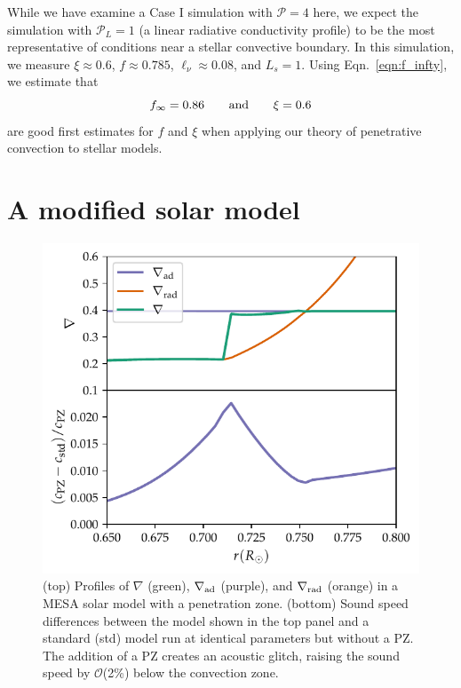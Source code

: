 \documentclass[twocolumn]{aastex631}
\newcommand{\gradrad}{\ensuremath{\nabla_{\rm{rad}}}}
\newcommand{\gradad}{\ensuremath{\nabla_{\rm{ad}}}}
\newcommand{\justgrad}{\ensuremath{\nabla}}
\newcommand{\mP}{\ensuremath{\mathcal{P}}}
\begin{document}
While we have examine a Case I simulation with $\mP = 4$ here, we expect the simulation with $\mP_L = 1$ (a linear radiative conductivity profile) to be the most representative of conditions near a stellar convective boundary.
In this simulation, we measure $\xi \approx 0.6$, $f \approx 0.785$, $\ell_\nu \approx 0.08$, and $L_s = 1$.
Using Eqn.~\ref{eqn:f_infty}, we estimate that
\begin{equation}
f_\infty = 0.86\qquad\rm{and}\qquad
\xi = 0.6
\label{eqn:f_xi_estimates}
\end{equation}
are good first estimates for $f$ and $\xi$ when applying our theory of penetrative convection to stellar models.

\section{A modified solar model}
\label{sec:solar_model}

\begin{figure}[t]
\centering
\includegraphics[width=\columnwidth]{mesa_profiles.pdf}
\caption{
(top) Profiles of $\justgrad$ (green), $\gradad$ (purple), and $\gradrad$ (orange) in a MESA solar model with a penetration zone.
(bottom) Sound speed differences between the model shown in the top panel and a standard (std) model run at identical parameters but without a PZ.
The addition of a PZ creates an acoustic glitch, raising the sound speed by $\mathcal{O}$(2\%) below the convection zone.
\label{fig:mesa_profiles}
}
\end{figure}
\end{document}
